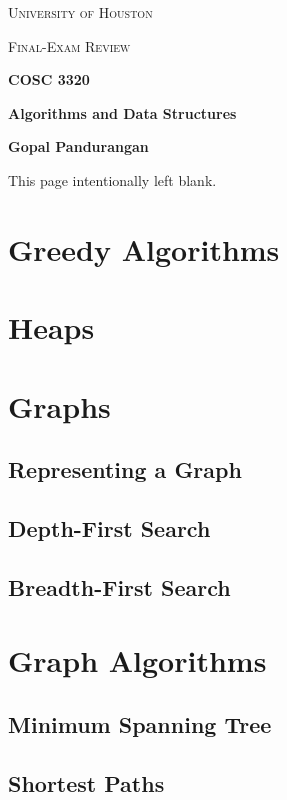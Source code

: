 \documentclass[a4paper]{article}
\theoremstyle{definition}
\begin{document}
\begin{titlepage}
	\centering
	{\scshape\LARGE University of Houston\par}
	\vspace{1cm}
	{\scshape\Large Final-Exam Review \par}
	\vspace{1.5cm}
	{\huge\bfseries COSC 3320 \par}
	{\huge\bfseries Algorithms and Data Structures\par}
	\vspace{0.5cm}
	{\large\bfseries Gopal Pandurangan\par}
	\vspace{2cm}
	\vfill

\end{titlepage}
\vspace*{\fill}\begin{center}{\Huge This page intentionally left blank.}\end{center}\vspace*{\fill}\thispagestyle{empty}\clearpage
{}
\section{Greedy Algorithms}

\section{Heaps}

\section{Graphs}
\subsection{Representing a Graph}
\subsection{Depth-First Search}
\subsection{Breadth-First Search}

\section{Graph Algorithms}
\subsection{Minimum Spanning Tree}
\subsection{Shortest Paths}
\end{document}
